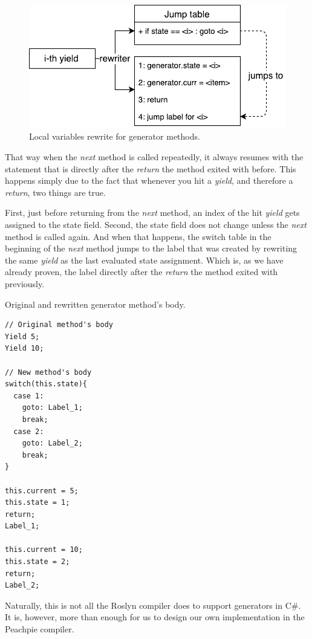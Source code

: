 \begin{figure}[h]
	\centering	
	\includegraphics[scale=0.75]{../img/4_1_position}	
	\caption{Local variables rewrite for generator methods.}
	\label{fig4.1:Position}
\end{figure}

That way when the \emph{next} method is called repeatedly, it always resumes with the statement that is directly after the \emph{return} the method exited with before. This happens simply due to the fact that whenever you hit a \emph{yield}, and therefore a \emph{return}, two things are true. 

First, just before returning from the \emph{next} method, an index of the hit \emph{yield} gets assigned to the state field. Second, the state field does not change unless the \emph{next} method is called again. And when that happens, the switch table in the beginning of the \emph{next} method jumps to the label that was created by rewriting the same \emph{yield} as the last evaluated state assignment. Which is, as we have already proven, the label directly after the \emph{return} the method exited with previously.

\begin{listing}[H]
\caption{Original and rewritten generator method's body.}
\label{list4.1:generatorRewrite}
\begin{verbatim}
// Original method's body
Yield 5;
Yield 10;

// New method's body
switch(this.state){
  case 1:
    goto: Label_1;
    break;
  case 2:
    goto: Label_2;
    break;
}

this.current = 5;
this.state = 1;
return;
Label_1;

this.current = 10;
this.state = 2;
return;
Label_2;
\end{verbatim}
\end{listing}

Naturally, this is not all the Roslyn compiler does to support generators in C\#. It is, however, more than enough for us to design our own implementation in the Peachpie compiler. 


